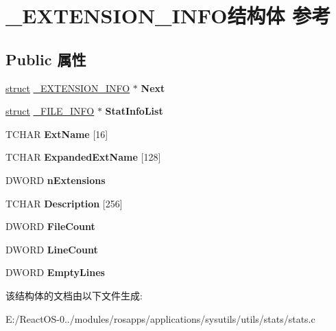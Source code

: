 \hypertarget{struct___e_x_t_e_n_s_i_o_n___i_n_f_o}{}\section{\+\_\+\+E\+X\+T\+E\+N\+S\+I\+O\+N\+\_\+\+I\+N\+F\+O结构体 参考}
\label{struct___e_x_t_e_n_s_i_o_n___i_n_f_o}
\subsection*{Public 属性}
\begin{DoxyCompactItemize}
\item 
\mbox{\label{struct___e_x_t_e_n_s_i_o_n___i_n_f_o_a8b49a55dc223019efbc7fd6e539ade64}} 
\hyperlink{interfacestruct}{struct} \hyperlink{struct___e_x_t_e_n_s_i_o_n___i_n_f_o}{\+\_\+\+E\+X\+T\+E\+N\+S\+I\+O\+N\+\_\+\+I\+N\+FO} $\ast$ {\bfseries Next}
\item 
\mbox{\label{struct___e_x_t_e_n_s_i_o_n___i_n_f_o_a0bf0bf62f30b65d0d754b80d342b5fca}} 
\hyperlink{interfacestruct}{struct} \hyperlink{struct___f_i_l_e___i_n_f_o}{\+\_\+\+F\+I\+L\+E\+\_\+\+I\+N\+FO} $\ast$ {\bfseries Stat\+Info\+List}
\item 
\mbox{\label{struct___e_x_t_e_n_s_i_o_n___i_n_f_o_a279ef14032d9eb8f7159b4381b3f1f08}} 
T\+C\+H\+AR {\bfseries Ext\+Name} \mbox{[}16\mbox{]}
\item 
\mbox{\label{struct___e_x_t_e_n_s_i_o_n___i_n_f_o_a98c720956d2edd763da8d8eae8d76332}} 
T\+C\+H\+AR {\bfseries Expanded\+Ext\+Name} \mbox{[}128\mbox{]}
\item 
\mbox{\label{struct___e_x_t_e_n_s_i_o_n___i_n_f_o_abf4d2167041f84bcaf438b376c474040}} 
D\+W\+O\+RD {\bfseries n\+Extensions}
\item 
\mbox{\label{struct___e_x_t_e_n_s_i_o_n___i_n_f_o_aac1b1632c28c6d46db8606d94467513f}} 
T\+C\+H\+AR {\bfseries Description} \mbox{[}256\mbox{]}
\item 
\mbox{\label{struct___e_x_t_e_n_s_i_o_n___i_n_f_o_a5c093b26860b1ae4679e06b75e36c480}} 
D\+W\+O\+RD {\bfseries File\+Count}
\item 
\mbox{\label{struct___e_x_t_e_n_s_i_o_n___i_n_f_o_a0569434b0536b3a390d1dad3f23715fa}} 
D\+W\+O\+RD {\bfseries Line\+Count}
\item 
\mbox{\label{struct___e_x_t_e_n_s_i_o_n___i_n_f_o_a2a5deef6be91fb60ee30e940c0d79fd5}} 
D\+W\+O\+RD {\bfseries Empty\+Lines}
\end{DoxyCompactItemize}


该结构体的文档由以下文件生成\+:\begin{DoxyCompactItemize}
\item 
E\+:/\+React\+O\+S-\/0../modules/rosapps/applications/sysutils/utils/stats/stats.\+c\end{DoxyCompactItemize}
